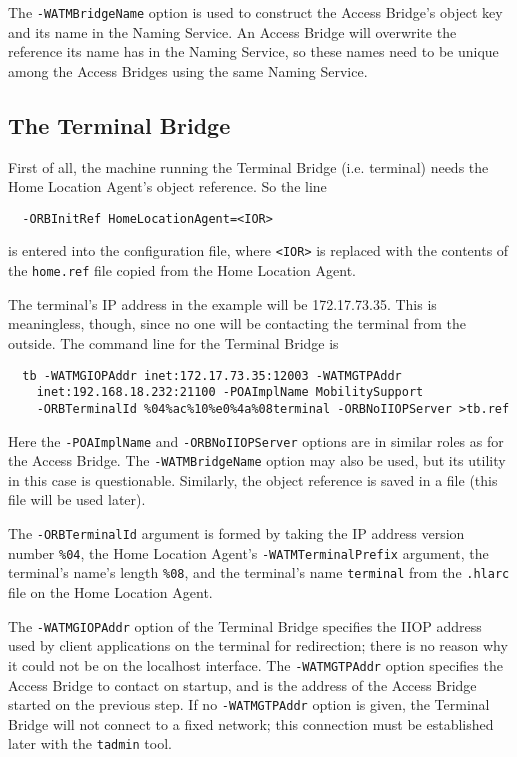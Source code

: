 \documentclass[12pt,a4paper,draft]{article}
\begin{document}
The \texttt{-WATMBridgeName} option is used to construct the Access
Bridge's object key and its name in the Naming Service.  An Access
Bridge will overwrite the reference its name has in the Naming
Service, so these names need to be unique among the Access Bridges
using the same Naming Service.

\subsection{The Terminal Bridge}

First of all, the machine running the Terminal Bridge (i.e. terminal)
needs the Home Location Agent's object reference.  So the line

\small
\begin{verbatim}
  -ORBInitRef HomeLocationAgent=<IOR>
\end{verbatim}
\normalsize

is entered into the configuration file, where \texttt{<IOR>} is
replaced with the contents of the \texttt{home.ref} file copied from
the Home Location Agent.

The terminal's IP address in the example will be 172.17.73.35.  This
is meaningless, though, since no one will be contacting the terminal
from the outside.  The command line for the Terminal Bridge is

\small
\begin{verbatim}
  tb -WATMGIOPAddr inet:172.17.73.35:12003 -WATMGTPAddr
    inet:192.168.18.232:21100 -POAImplName MobilitySupport
    -ORBTerminalId %04%ac%10%e0%4a%08terminal -ORBNoIIOPServer >tb.ref
\end{verbatim}

Here the \texttt{-POAImplName} and \texttt{-ORBNoIIOPServer} options
are in similar roles as for the Access Bridge.  The
\texttt{-WATMBridgeName} option may also be used, but its utility in
this case is questionable.  Similarly, the object reference is saved
in a file (this file will be used later).

The \texttt{-ORBTerminalId} argument is formed by taking the IP
address version number \texttt{\%04}, the Home Location Agent's
\texttt{-WATMTerminalPrefix} argument, the terminal's name's length
\texttt{\%08}, and the terminal's name \texttt{terminal} from the
\texttt{.hlarc} file on the Home Location Agent.

The \texttt{-WATMGIOPAddr} option of the Terminal Bridge specifies the
IIOP address used by client applications on the terminal for
redirection; there is no reason why it could not be on the localhost
interface.  The \texttt{-WATMGTPAddr} option specifies the Access
Bridge to contact on startup, and is the address of the Access Bridge
started on the previous step.  If no \texttt{-WATMGTPAddr} option is
given, the Terminal Bridge will not connect to a fixed network; this
connection must be established later with the \texttt{tadmin} tool.
\end{document}

